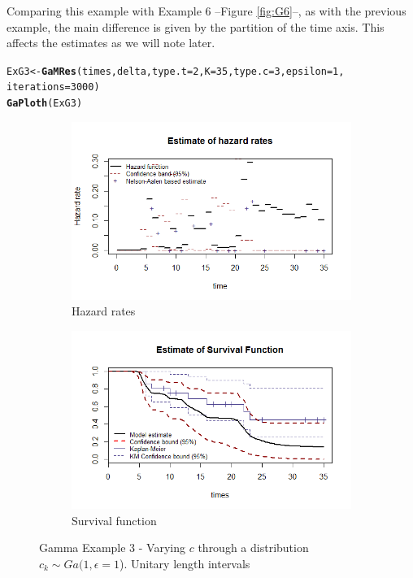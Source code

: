 \documentclass[letterpaper]{article}\usepackage[]{graphicx}\usepackage[]{color}
\makeatletter
\newcommand{\hlnum}[1]{\textcolor[rgb]{0.686,0.059,0.569}{#1}}%
\newcommand{\hlstd}[1]{\textcolor[rgb]{0.345,0.345,0.345}{#1}}%
\newcommand{\hlkwb}[1]{\textcolor[rgb]{0.69,0.353,0.396}{#1}}%
\newcommand{\hlkwc}[1]{\textcolor[rgb]{0.333,0.667,0.333}{#1}}%
\newcommand{\hlkwd}[1]{\textcolor[rgb]{0.737,0.353,0.396}{\textbf{#1}}}%
\newenvironment{kframe}{%
 \def\at@end@of@kframe{}%
 \ifinner\ifhmode%
  \def\at@end@of@kframe{\end{minipage}}%
  \begin{minipage}{\columnwidth}%
 \fi\fi%
 \def\FrameCommand##1{\hskip\@totalleftmargin \hskip-\fboxsep
 \colorbox{shadecolor}{##1}\hskip-\fboxsep
     \hskip-\linewidth \hskip-\@totalleftmargin \hskip\columnwidth}%
 \MakeFramed {\advance\hsize-\width
   \@totalleftmargin\z@ \linewidth\hsize
   \@setminipage}}%
 {\par\unskip\endMakeFramed%
 \at@end@of@kframe}
\newenvironment{knitrout}{}{} %
\makeatother
\begin{document}
Comparing this example with Example 6 --Figure \ref{fig:G6}--, as with the previous example, the main difference is given by the partition of the time axis. This affects the estimates as we will note later.

\begin{knitrout}
\color{fgcolor}\begin{kframe}
\begin{alltt}
\hlstd{ExG3} \hlkwb{<-} \hlkwd{GaMRes}\hlstd{(times, delta,} \hlkwc{type.t} \hlstd{=} \hlnum{2}\hlstd{,} \hlkwc{K} \hlstd{=} \hlnum{35}\hlstd{,} \hlkwc{type.c} \hlstd{=} \hlnum{3}\hlstd{,} \hlkwc{epsilon} \hlstd{=} \hlnum{1}\hlstd{,}
               \hlkwc{iterations} \hlstd{=} \hlnum{3000}\hlstd{)}
\hlkwd{GaPloth}\hlstd{(ExG3)}
\end{alltt}
\end{kframe}
\end{knitrout}

\begin{figure}
  \centering
  \begin{subfigure}[a]{\textwidth}\centering
    \includegraphics[width=\textwidth]{G31.png}
    \caption{Hazard rates}
  \end{subfigure}
  \begin{subfigure}[b]{\textwidth}\centering
    \includegraphics[width=\textwidth]{G32.png}
    \caption{Survival function}
  \end{subfigure}
  \caption{Gamma Example 3 - Varying $c$ through a distribution $c_k\sim Ga(1,\epsilon = 1$). Unitary length intervals}
  \label{fig:G3}
\end{figure}
\end{document}
